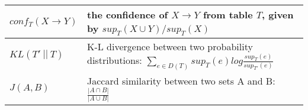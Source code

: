 \begin{table}[th]
\begin{tabular}{m{}|m{}}
  \\ \hline
  $conf_{T}(X \rightarrow Y)$ & the confidence of $X \rightarrow Y$ from table $T$, given by $sup_T(X \cup Y)/sup_T(X)$ \\ \hline
  $KL(T'~||~T)$ & K-L divergence between two probability distributions:
  $\sum_{e\in D(T)}sup_T(e)log\frac{sup_T(e) }{sup_{T'}(e)}$ 
  \\ \hline
  $J(A, B)$ & Jaccard similarity between two sets A and B:
  $\frac{|A \cap B|}{|A \cup B|}$ 
  \\ \hline
\end{tabular}
\end{table}



